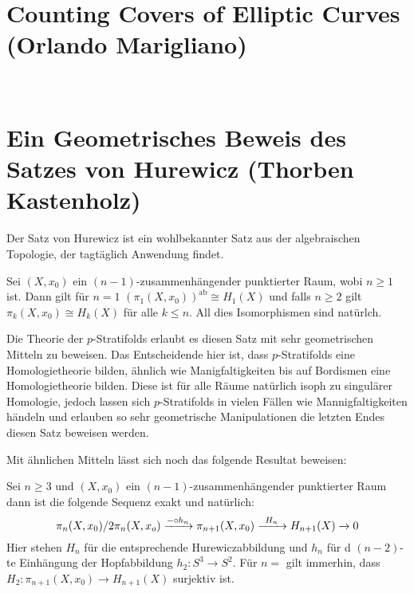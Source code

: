 \tableofcontents

\clearpage

\section{Counting Covers of Elliptic Curves (Orlando Marigliano)}

\ 

\section{Ein Geometrisches Beweis des Satzes von Hurewicz
(Thorben Kastenholz)}

Der Satz von Hurewicz ist ein wohlbekannter Satz aus der algebraischen
Topologie, der tagtäglich Anwendung findet.

\begin{satz}
Sei $(X,x_0)$ ein $(n-1)$-zusammenhängender punktierter Raum, wobi $n\geq 1$
ist. Dann gilt für $n=1$ $(\pi_1(X,x_0))^{\mathrm{ab}} \cong H_1(X)$ und falls
$n \geq 2$ gilt $\pi_k(X,x_0) \cong H_k(X)$ für alle $k\leq n$. All dies
Isomorphismen sind natürlch.
\end{satz}

Die Theorie der $p$-Stratifolds erlaubt es diesen Satz mit sehr geometrischen
Mitteln zu beweisen. Das Entscheidende hier ist, dass $p$-Stratifolds eine
Homologietheorie bilden, ähnlich wie Manigfaltigkeiten bis auf Bordismen eine
Homologietheorie bilden. Diese ist für alle Räume natürlich isoph zu
singulärer Homologie, jedoch lassen sich $p$-Stratifolds in vielen Fällen wie
Mannigfaltigkeiten händeln und erlauben so sehr geometrische Manipulationen
die letzten Endes diesen Satz beweisen werden.

Mit ähnlichen Mitteln lässt sich noch das folgende Resultat beweisen:
\begin{satz}
Sei $n \geq 3$ und $(X,x_0)$ ein $(n-1)$-zusammenhängender punktierter Raum
dann ist die folgende Sequenz exakt und natürlich:
\[
\pi_n(X,x_0)/2\pi_n(X,x_o) \xrightarrow{- \circ h_n} \pi_{n+1}(X,x_0)
\xrightarrow{\hspace{1ex} H_n \hspace{1ex}} H_{n+1}(X) \xrightarrow{} 0
\]
Hier stehen $H_n$ für die entsprechende Hurewiczabbildung und $h_n$ für d
$(n-2)$-te Einhängung der Hopfabbildung $h_2 \colon S^3 \to S^2$. Für $n=
$ gilt immerhin, dass $H_2 \colon \pi_{n+1}(X,x_0) \to H_{n+1}(X)$ surjektiv ist.
\end{satz}

